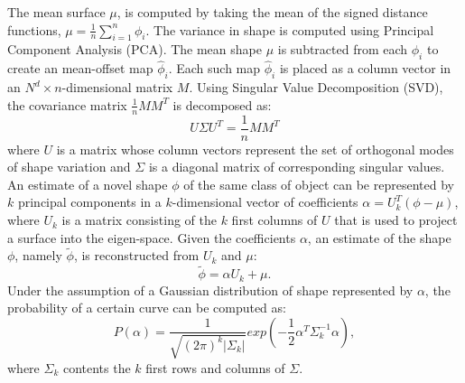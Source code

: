 The mean surface $\mu$, is computed by taking the mean of the signed distance functions, $\mu = \frac{1}{n} \sum_{i=1}^n \phi_i$. The variance in shape is computed using Principal Component Analysis (PCA). The mean shape $\mu$ is subtracted from each $\phi_i$ to create an mean-offset map $\hat{\phi}_i$. Each such map $\hat{\phi}_i$ is placed as a column vector in an $N^d \times n$-dimensional matrix $M$. Using Singular Value Decomposition (SVD), the covariance matrix $\frac{1}{n}MM^T$ is decomposed as:
\begin{equation}
  \label{eq:decomp_leventon}
  U\Sigma U^T = \frac{1}{n}MM^T
\end{equation}
where $U$ is a matrix whose column vectors represent the set of orthogonal modes of shape variation and $\Sigma$ is a diagonal matrix of corresponding singular values. An estimate of a novel shape $\phi$ of the same class of object can be represented by $k$ principal components in a $k$-dimensional vector of coefficients $\alpha = U_k^T(\phi-\mu)$, where $U_k$ is a matrix consisting of the $k$ first columns of $U$ that is used to project a surface into the eigen-space. Given the coefficients $\alpha$, an estimate of the shape $\phi$, namely $\tilde{\phi}$, is reconstructed from $U_k$ and $\mu$:
\begin{equation}
  \label{eq:recomstr_leventon}
  \tilde{\phi} = \alpha U_k + \mu.
\end{equation}
Under the assumption of a Gaussian distribution of shape represented by $\alpha$, the probability of a certain curve can be computed as:
\begin{equation}
  \label{eq:prob_leventon}
  P(\alpha) = \frac{1}{\sqrt{(2\pi)^k|\Sigma_k|}}exp \left(-\frac{1}{2}\alpha^T\Sigma_k^{-1}\alpha \right),
\end{equation}
where $\Sigma_k$ contents the $k$ first rows and columns of $\Sigma$.


